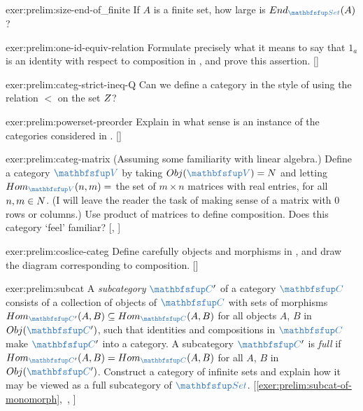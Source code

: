 \begin{exer}{}{exer:prelim:size-end-of_finite}
  If $A$ is a finite set, how large is $\End_{\categ{Set}}(A)$?
\end{exer}

\begin{exer}{}{exer:prelim:one-id-equiv-relation}
  \exerused{} Formulate precisely what it means to say that $1_a$ is
  an identity with respect to composition in
  , and prove this
  assertion. []
\end{exer}

\begin{exer}{}{exer:prelim:categ-strict-ineq-Q}
  Can we define a category in the style of
   using the relation $<$ on the set
  $Z$?
\end{exer}

\begin{exer}{}{exer:prelim:powerset-preorder}
  \exerused{} Explain in what sense
   is an instance of the
  categories considered in
  . []
\end{exer}

\begin{exer}{}{exer:prelim:categ-matrix}
  \exerused{} (Assuming some familiarity with linear algebra.) Define
  a category $\categ{V}$ by taking $\Obj(\categ{V}) = \N$ and letting
  $\Hom_{\categ{V}}(n, m) = $ the set of $m \times n$ matrices with
  real entries, for all $n, m \in N$. (I will leave the reader the
  task of making sense of a matrix with 0 rows or columns.) Use
  product of matrices to define composition. Does this category `feel'
  familiar? [,
  ]
\end{exer}

\begin{exer}{}{exer:prelim:coslice-categ}
  \exerused{} Define carefully objects and morphisms in
  , and draw the diagram
  corresponding to composition. []
\end{exer}

\begin{exer}{}{exer:prelim:subcat}
  \exerused{} A \emph{subcategory} $\categ{C}'$ of a category
  $\categ{C}$ consists of a collection of objects of $\categ{C}$ with
  sets of morphisms
  $\Hom_{\categ{C}'}(A, B) \subseteq \Hom_{\categ{C}}(A, B)$ for all
  objects $A$, $B$ in $\Obj(\categ{C}')$, such that identities and
  compositions in $\categ{C}$ make $\categ{C}'$ into a category. A
  subcategory $\categ{C}'$ is \emph{full} if
  $\Hom_{\categ{C}'}(A, B) = \Hom_{\categ{C}}(A, B)$ for all $A$, $B$
  in $\Obj(\categ{C}')$. Construct a category of infinite sets and
  explain how it may be viewed as a full subcategory of
  $\categ{Set}$.\@
  [\ref{exer:prelim:subcat-of-monomorph},~,
  ]
\end{exer}

